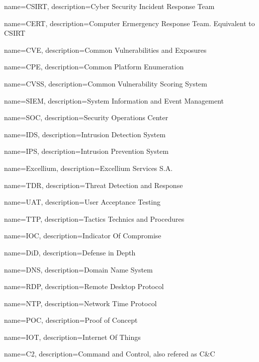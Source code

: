 
{
  name=CSIRT,
  description={Cyber Security Incident Response Team}
}

{
  name=CERT,
  description={Computer Ermergency Response Team. Equivalent to CSIRT}
}

{
  name=CVE,
  description={Common Vulnerabilities and Exposures}
}

{
  name=CPE,
  description={Common Platform Enumeration}
}

{
  name=CVSS,
  description={Common Vulnerability Scoring System}
}

{
  name=SIEM,
  description={System Information and Event Management}
}

{
  name=SOC,
  description={Security Operations Center}
}

{
  name=IDS,
  description={Intrusion Detection System}
}

{
  name=IPS,
  description={Intrusion Prevention System}
}

{
  name=Excellium,
  description={Excellium Services S.A.}
}

{
  name=TDR,
  description={Threat Detection and Response}
}

{
  name=UAT,
  description={User Acceptance Testing}
}

{
  name=TTP,
  description={Tactics Technics and Procedures}
}

{
  name=IOC,
  description={Indicator Of Compromise}
}


{
  name=DiD,
  description={Defense in Depth}
}

{
  name=DNS,
  description={Domain Name System}
}

{
  name=RDP,
  description={Remote Desktop Protocol}
}

{
  name=NTP,
  description={Network Time Protocol}
}

{
  name=POC,
  description={Proof of Concept}
}

{
  name=IOT,
  description={Internet Of Things}
}

{
  name=C2,
  description={Command and Control, also refered as C\&C}
}


